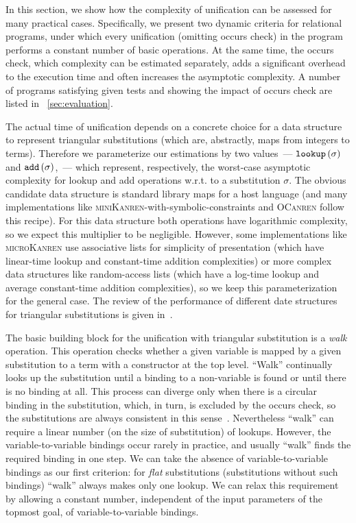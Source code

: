 In this section, we show how the complexity of unification can be assessed for many practical cases. Specifically, we present two dynamic criteria
for relational programs, under which every unification (omitting occurs check) in the program performs a constant number of basic operations. At the same
time, the occurs check, which complexity can be estimated separately, adds a significant overhead to the execution time and often increases the asymptotic complexity.
A number of programs satisfying given tests and showing the impact of occurs check are listed in \sectionword~\ref{sec:evaluation}.

The actual time of unification depends on a concrete choice for a data structure to represent triangular substitutions (which are, abstractly, maps from integers to terms).
Therefore we parameterize our estimations by two values~--- $\texttt{lookup}\,(\sigma)$ and $\texttt{add}\,(\sigma)$,~--- which represent, respectively, the
worst-case asymptotic complexity for lookup and add operations w.r.t. to a substitution $\sigma$. The obvious candidate data structure is standard library maps
for a host language (and many implementations like \textsc{miniKanren}-with-symbolic-constraints and \textsc{OCanren} follow this recipe). 
For this data structure both operations have logarithmic complexity,
so we expect this multiplier to be negligible. However, some implementations like \textsc{microKanren} use associative lists for simplicity of presentation (which have linear-time
lookup and constant-time addition complexities) or more complex data structures like random-access lists (which have a log-time lookup and average constant-time addition complexities),
so we keep this parameterization for the general case. The review of the performance of different date structures for triangular substitutions is given in~\cite{SubstDataStructs}.

The basic building block for the unification with triangular substitution is a \emph{walk} operation. This operation checks whether a given variable is mapped by a given substitution to a
term with a constructor at the top level. ``Walk'' continually looks up the substitution until a binding to a non-variable is found or until there is no binding at all. This
process can diverge only when there is a circular binding in the substitution, which, in turn, is excluded by the occurs check, so the substitutions are always consistent
in this sense~\cite{NominalUnificationWithTriangularSubstitutions}. Nevertheless ``walk'' can require a linear number (on the size of substitution) of lookups.
However, the variable-to-variable bindings occur rarely in practice, and usually ``walk'' finds the required binding in one step. We can take the absence of variable-to-variable bindings
as our first criterion: for \emph{flat} substitutions (substitutions without such bindings) ``walk'' always makes only one lookup. We can relax this requirement by allowing a
constant number, independent of the input parameters of the topmost goal, of variable-to-variable bindings.

